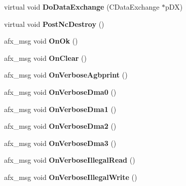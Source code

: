 \begin{DoxyCompactItemize}
\item 
\mbox{\label{class_logging_acae1b2006158246fdb01652ef474b35e}} 
virtual void {\bfseries Do\+Data\+Exchange} (C\+Data\+Exchange $\ast$p\+DX)
\item 
\mbox{\label{class_logging_ab1765bcb53cd404f0e511f5a20e05f78}} 
virtual void {\bfseries Post\+Nc\+Destroy} ()
\item 
\mbox{\label{class_logging_a65ef606af9b874a580b1845405414e3d}} 
afx\+\_\+msg void {\bfseries On\+Ok} ()
\item 
\mbox{\label{class_logging_a3f790eea70e4747a0279fab3ccc4de33}} 
afx\+\_\+msg void {\bfseries On\+Clear} ()
\item 
\mbox{\label{class_logging_a2753a791376fbbf7afc759eda3c5f797}} 
afx\+\_\+msg void {\bfseries On\+Verbose\+Agbprint} ()
\item 
\mbox{\label{class_logging_a0b84d239efc2e8bb496a315804a41553}} 
afx\+\_\+msg void {\bfseries On\+Verbose\+Dma0} ()
\item 
\mbox{\label{class_logging_af1b9e807abdf717e20bf3cb7a3a39099}} 
afx\+\_\+msg void {\bfseries On\+Verbose\+Dma1} ()
\item 
\mbox{\label{class_logging_a5976754962789093961701eeeca3e0a9}} 
afx\+\_\+msg void {\bfseries On\+Verbose\+Dma2} ()
\item 
\mbox{\label{class_logging_acbb2488ba65d526996806d3a4156bac9}} 
afx\+\_\+msg void {\bfseries On\+Verbose\+Dma3} ()
\item 
\mbox{\label{class_logging_a33d7f61c6216cb3cff88fd4e1e614087}} 
afx\+\_\+msg void {\bfseries On\+Verbose\+Illegal\+Read} ()
\item 
\mbox{\label{class_logging_a16b403f45f3ac4191d65a09ed76b71ea}} 
afx\+\_\+msg void {\bfseries On\+Verbose\+Illegal\+Write} ()
\item 
\mbox{\label{class_logging_a259d3e7d18156282e39c7f8594c03c92}} 

\end{DoxyCompactItemize}
